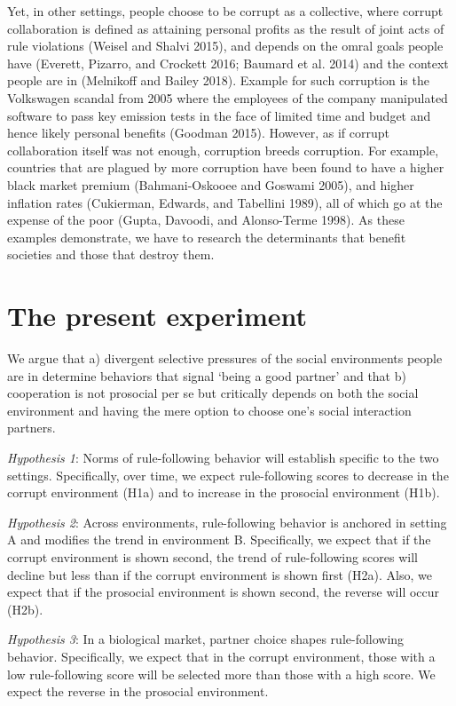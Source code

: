 \documentclass[man]{apa6}
\begin{document}
Yet, in other settings, people choose to be corrupt as a collective,
where corrupt collaboration is defined as attaining personal profits as
the result of joint acts of rule violations (Weisel and Shalvi 2015),
and depends on the omral goals people have (Everett, Pizarro, and
Crockett 2016; Baumard et al. 2014) and the context people are in
(Melnikoff and Bailey 2018). Example for such corruption is the
Volkswagen scandal from 2005 where the employees of the company
manipulated software to pass key emission tests in the face of limited
time and budget and hence likely personal benefits (Goodman 2015).
However, as if corrupt collaboration itself was not enough, corruption
breeds corruption. For example, countries that are plagued by more
corruption have been found to have a higher black market premium
(Bahmani-Oskooee and Goswami 2005), and higher inflation rates
(Cukierman, Edwards, and Tabellini 1989), all of which go at the expense
of the poor (Gupta, Davoodi, and Alonso-Terme 1998). As these examples
demonstrate, we have to research the determinants that benefit societies
and those that destroy them.

\hypertarget{the-present-experiment}{%
\section{The present experiment}\label{the-present-experiment}}

We argue that a) divergent selective pressures of the social
environments people are in determine behaviors that signal `being a good
partner' and that b) cooperation is not prosocial per se but critically
depends on both the social environment and having the mere option to
choose one's social interaction partners.

\emph{Hypothesis 1}: Norms of rule-following behavior will establish
specific to the two settings. Specifically, over time, we expect
rule-following scores to decrease in the corrupt environment (H1a) and
to increase in the prosocial environment (H1b).

\emph{Hypothesis 2}: Across environments, rule-following behavior is
anchored in setting A and modifies the trend in environment B.
Specifically, we expect that if the corrupt environment is shown second,
the trend of rule-following scores will decline but less than if the
corrupt environment is shown first (H2a). Also, we expect that if the
prosocial environment is shown second, the reverse will occur (H2b).

\emph{Hypothesis 3}: In a biological market, partner choice shapes
rule-following behavior. Specifically, we expect that in the corrupt
environment, those with a low rule-following score will be selected more
than those with a high score. We expect the reverse in the prosocial
environment.
\end{document}
